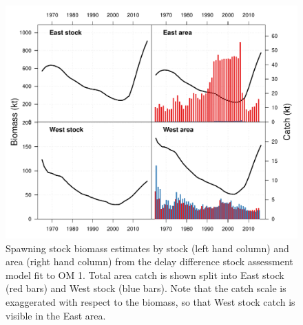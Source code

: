\documentclass[]{article}
\begin{document}
\begin{figure}[htb]

{\centering \includegraphics[width=0.9\linewidth]{data/AM/1/biomass} 

}

\caption{Spawning stock biomass estimates by stock (left hand column) and area (right hand column) from the delay difference stock assessment model fit to OM 1. Total area catch is shown split into East stock (red bars) and West stock (blue bars). Note that the catch scale is exaggerated with respect to the biomass, so that West stock catch is visible in the East area.}\label{fig:amBiomassPlot}
\end{figure}
\end{document}
